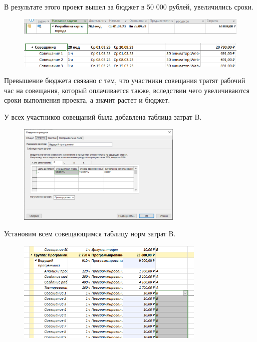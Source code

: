 В результате этого проект вышел за бюджет в 50 000 рублей, увеличились сроки.

\begin{figure}[H]
	\begin{center}
		\includegraphics[width=\textwidth]{imgs/task_2_3.png}
	\end{center}
\end{figure}

\begin{figure}[H]
	\begin{center}
		\includegraphics[width=\textwidth]{imgs/task_2_4.png}
	\end{center}
\end{figure}

Превышение бюджета связано с тем, что участники совещания тратят рабочий час на совещания, который оплачивается также, вследствии чего увеличиваются сроки выполнения проекта, а значит растет и бюджет.

У всех участников совещаний была добавлена таблица затрат B.

\begin{figure}[H]
	\begin{center}
		\includegraphics[width=0.7\textwidth]{imgs/task_2_5.png}
	\end{center}
\end{figure}

Установим всем совещающимся таблицу норм затрат B.

\begin{figure}[H]
	\begin{center}
		\includegraphics[width=0.8\textwidth]{imgs/task_2_6.png}
	\end{center}
\end{figure}

